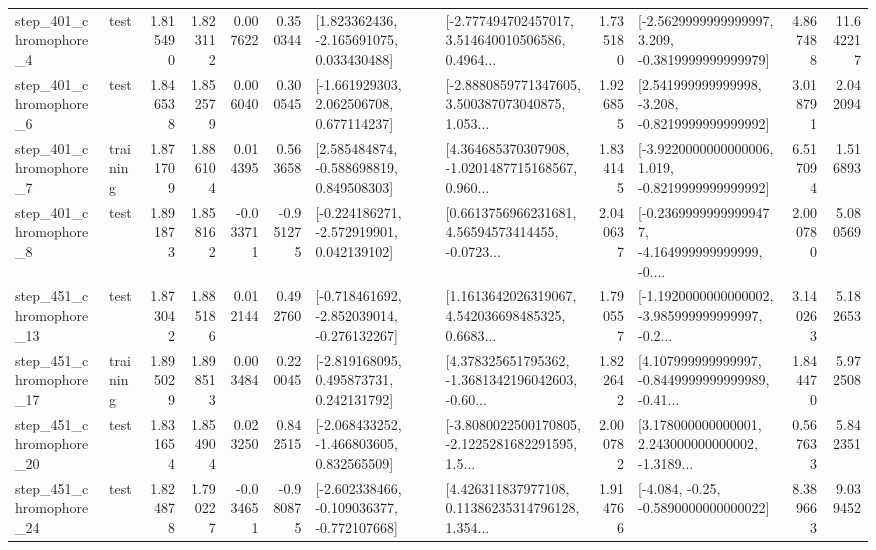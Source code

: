\begin{tabular}{llrrrrllrlrr}
   step\_401\_chromophore\_4 &      test &      1.815490 &    1.823112 &      0.007622 &  0.350344 &    [1.823362436, -2.165691075, 0.033430488] &  [-2.777494702457017, 3.514640010506586, 0.4964... &       1.735180 &  [-2.5629999999999997, 3.209, -0.3819999999999979] &            4.867488 &         11.642217 \\
   step\_401\_chromophore\_6 &      test &      1.846538 &    1.852579 &      0.006040 &  0.300545 &    [-1.661929303, 2.062506708, 0.677114237] &  [-2.8880859771347605, 3.500387073040875, 1.053... &       1.926855 &   [2.541999999999998, -3.208, -0.8219999999999992] &            3.018791 &          2.042094 \\
   step\_401\_chromophore\_7 &  training &      1.871709 &    1.886104 &      0.014395 &  0.563658 &    [2.585484874, -0.588698819, 0.849508303] &  [4.364685370307908, -1.0201487715168567, 0.960... &       1.834145 &  [-3.9220000000000006, 1.019, -0.8219999999999992] &            6.517094 &          1.516893 \\
   step\_401\_chromophore\_8 &      test &      1.891873 &    1.858162 &     -0.033711 & -0.951275 &   [-0.224186271, -2.572919901, 0.042139102] &  [0.6613756966231681, 4.56594573414455, -0.0723... &       2.040637 &  [-0.23699999999999477, -4.164999999999999, -0.... &            2.000780 &          5.080569 \\
  step\_451\_chromophore\_13 &      test &      1.873042 &    1.885186 &      0.012144 &  0.492760 &  [-0.718461692, -2.852039014, -0.276132267] &  [1.1613642026319067, 4.542036698485325, 0.6683... &       1.790557 &  [-1.1920000000000002, -3.985999999999997, -0.2... &            3.140263 &          5.182653 \\
  step\_451\_chromophore\_17 &  training &      1.895029 &    1.898513 &      0.003484 &  0.220045 &    [-2.819168095, 0.495873731, 0.242131792] &  [4.378325651795362, -1.3681342196042603, -0.60... &       1.822642 &  [4.107999999999997, -0.8449999999999989, -0.41... &            1.844470 &          5.972508 \\
  step\_451\_chromophore\_20 &      test &      1.831654 &    1.854904 &      0.023250 &  0.842515 &   [-2.068433252, -1.466803605, 0.832565509] &  [-3.8080022500170805, -2.1225281682291595, 1.5... &       2.000782 &  [3.178000000000001, 2.243000000000002, -1.3189... &            0.567633 &          5.842351 \\
  step\_451\_chromophore\_24 &      test &      1.824878 &    1.790227 &     -0.034651 & -0.980875 &  [-2.602338466, -0.109036377, -0.772107668] &  [4.426311837977108, 0.11386235314796128, 1.354... &       1.914766 &               [-4.084, -0.25, -0.5890000000000022] &            8.389663 &          9.039452 \\

\end{tabular}
